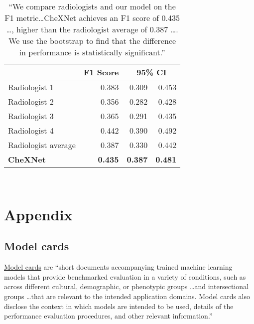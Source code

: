 \documentclass{article}
\begin{document}
\begin{adjustwidth}{-60pt}{-30pt}
\begin{singlespace}
\begin{tcolorbox}[title=\textbf{Model Card - CheXNet},
    breakable, sharp corners, boxrule=0.7pt]
{
\begin{table}[H]
\centering
\small{
\begin{tabular}{lrrr}
& \multicolumn{1}{l}{F1 Score} & \multicolumn{2}{c}{\textcolor{cicolor}{95\% CI}} \\ \hline
Radiologist 1       & 0.383  & \textcolor{cicolor}{0.309}   & \textcolor{cicolor}{ 0.453}  \\
Radiologist 2       & 0.356  & \textcolor{cicolor}{0.282}   & \textcolor{cicolor}{0.428}  \\
Radiologist 3       & 0.365  & \textcolor{cicolor}{0.291}   & \textcolor{cicolor}{0.435}  \\
Radiologist 4       & 0.442  & \textcolor{cicolor}{0.390}   & \textcolor{cicolor}{0.492}  \\
Radiologist average & 0.387  & \textcolor{cicolor}{0.330}   & \textcolor{cicolor}{0.442}  \\ \hline
\textbf{CheXNet}    & \textbf{0.435} & \textcolor{cicolor}{\textbf{0.387}} & \textcolor{cicolor}{\textbf{0.481}} \\ \hline
\end{tabular} } \\
\caption[CheXNet F1 score compared to radiologists F1 scores.]{\small{``We compare radiologists and our model on the F1 metric\ldots CheXNet achieves an F1 score of 0.435 \ldots, higher than the radiologist average of 0.387 \ldots. We use the bootstrap to find that the difference in performance is statistically significant.'' \cite{Rajpurkar2017}}}
\end{table}


} %
\end{tcolorbox}
\end{singlespace}
\end{adjustwidth}

\section{Appendix}

\subsection{Model cards}

\href{https://arxiv.org/abs/1810.03993}{Model cards} are ``short documents accompanying trained machine learning models that provide benchmarked evaluation in a variety of conditions, such as across different cultural, demographic, or phenotypic groups \ldots and intersectional groups \ldots that are relevant to the intended application domains. Model cards also disclose the context in which models are intended to be used, details of the performance evaluation procedures, and other relevant information.''
\end{document}
